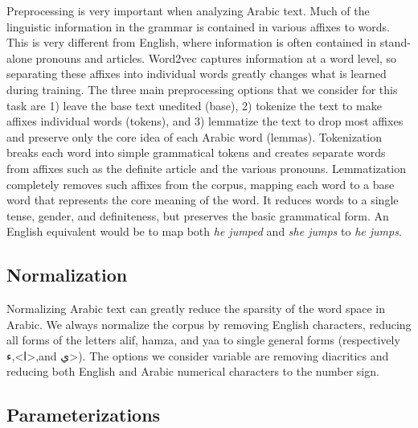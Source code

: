 Preprocessing is very important when analyzing Arabic text. Much of the linguistic information in the grammar is contained in various affixes to words. This is very different from English, where information is often contained in stand-alone pronouns and articles. Word2vec captures information at a word level, so separating these affixes into individual words greatly changes what is learned during training. The three main preprocessing options that we consider for this task are 1) leave the base text unedited (base), 2) tokenize the text to make affixes individual words (tokens), and 3) lemmatize the text to drop most affixes and preserve only the core idea of each Arabic word (lemmas). Tokenization breaks each word into simple grammatical tokens and creates separate words from affixes such as the definite article and the various pronouns. Lemmatization completely removes such affixes from the corpus, mapping each word to a base word that represents the core meaning of the word. It reduces words to a single tense, gender, and definiteness, but preserves the basic grammatical form. An English equivalent would be to map both \textit{he jumped} and \textit{she jumps} to \textit{he jumps}.

\subsection{Normalization}

Normalizing Arabic text can greatly reduce the sparsity of the word space in Arabic. We always normalize the corpus by removing English characters, reducing all forms of the letters alif, hamza, and yaa to single general forms (respectively \<ا>,\<ء>,and \<ي>).  The options we consider variable are removing diacritics and reducing both English and Arabic numerical characters to the number sign.

\subsection{Parameterizations}

